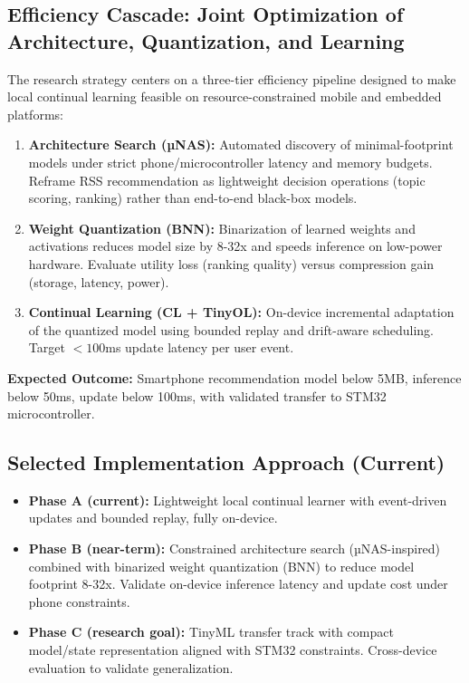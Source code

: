 \documentclass[11pt]{article}
\begin{document}
\subsection{Efficiency Cascade: Joint Optimization of Architecture, Quantization, and Learning}
\label{sec:efficiency-cascade}

The research strategy centers on a three-tier efficiency pipeline designed to make local continual learning feasible on resource-constrained mobile and embedded platforms:

\begin{enumerate}[leftmargin=*]
\item \textbf{Architecture Search (µNAS):} Automated discovery of minimal-footprint models under strict phone/microcontroller latency and memory budgets. Reframe RSS recommendation as lightweight decision operations (topic scoring, ranking) rather than end-to-end black-box models.
\item \textbf{Weight Quantization (BNN):} Binarization of learned weights and activations reduces model size by 8-32x and speeds inference on low-power hardware. Evaluate utility loss (ranking quality) versus compression gain (storage, latency, power).
\item \textbf{Continual Learning (CL + TinyOL):} On-device incremental adaptation of the quantized model using bounded replay and drift-aware scheduling. Target $<100$ms update latency per user event.
\end{enumerate}

\textbf{Expected Outcome:} Smartphone recommendation model below 5MB, inference below 50ms, update below 100ms, with validated transfer to STM32 microcontroller.

\subsection{Selected Implementation Approach (Current)}
\begin{itemize}[leftmargin=*]
\item \textbf{Phase A (current):} Lightweight local continual learner with event-driven updates and bounded replay, fully on-device.
\item \textbf{Phase B (near-term):} Constrained architecture search (µNAS-inspired) combined with binarized weight quantization (BNN) to reduce model footprint 8-32x. Validate on-device inference latency and update cost under phone constraints.
\item \textbf{Phase C (research goal):} TinyML transfer track with compact model/state representation aligned with STM32 constraints. Cross-device evaluation to validate generalization.
\end{itemize}
\end{document}
